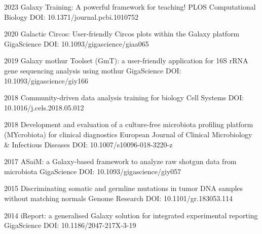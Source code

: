 \documentclass[]{shiltemann-cv}
\begin{document}
\begin{entrylist}
\entry
  {2023}
  {Galaxy Training: A powerful framework for teaching!}
  {PLOS Computational Biology}
  {DOI: 10.1371/journal.pcbi.1010752 }

\end{entrylist}
\begin{entrylist}

\entry
  {2020}
  {Galactic Circos: User-friendly Circos plots within the Galaxy platform}
  {GigaScience}
  {DOI: 10.1093/gigascience/giaa065}

\end{entrylist}
\begin{entrylist}

\entry
  {2019}
  {Galaxy mothur Toolset (GmT): a user-friendly application for 16S rRNA gene sequencing analysis using mothur}
  {GigaScience}
  {DOI: 10.1093/gigascience/giy166}

\end{entrylist}
\begin{entrylist}

\entry
 {2018}
 {Community-driven data analysis training for biology}
 {Cell Systems}
 {DOI: 10.1016/j.cels.2018.05.012}

\end{entrylist}
\begin{entrylist}

\entry
  {2018}
  {Development and evaluation of a culture-free microbiota profiling platform (MYcrobiota) for clinical diagnostics}
  {European Journal of Clinical Microbiology \& Infectious Diseases}
  {DOI: 10.1007/s10096-018-3220-z}


\end{entrylist}
\begin{entrylist}

\entry
  {2017}
  {ASaiM: a Galaxy-based framework to analyze raw shotgun data from microbiota}
  {GigaScience}
  {DOI: 10.1093/gigascience/giy057}


\end{entrylist}
\begin{entrylist}

\entry
  {2015}
  {Discriminating somatic and germline mutations in tumor DNA samples without matching normals }
  {Genome Research}
  {DOI: 10.1101/gr.183053.114}

\end{entrylist}
\begin{entrylist}

\entry
  {2014}
  {iReport: a generalised Galaxy solution for integrated experimental reporting}
  {GigaScience}
  {DOI: 10.1186/2047-217X-3-19}
\end{entrylist}
\end{document}
